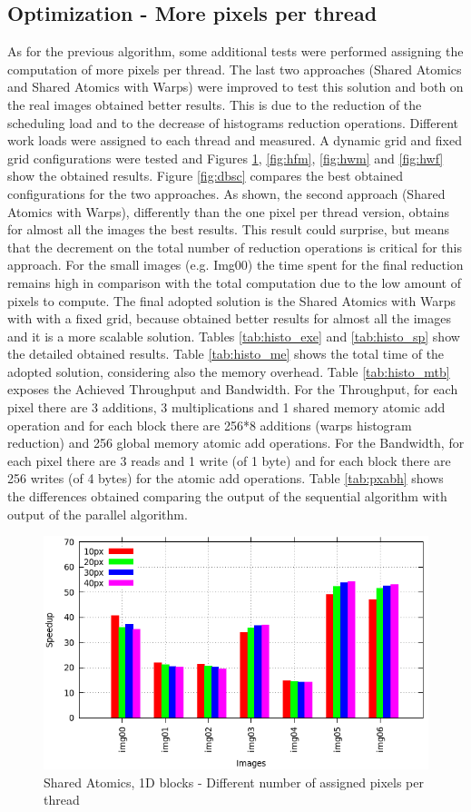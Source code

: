 \documentclass[a4paper]{article}
\begin{document}
\subsection{Optimization - More pixels per thread}
\label{sec:hop}
As for the previous algorithm, some additional tests were performed assigning the computation of more pixels per thread. The last two approaches (Shared Atomics and Shared Atomics with Warps) were improved to test this solution and both on the real images obtained better results. This is due to the reduction of the scheduling load and to the decrease of histograms reduction operations. Different work loads were assigned to each thread and measured. A dynamic grid and fixed grid configurations were tested and Figures \ref{fig:hum}, \ref{fig:hfm}, \ref{fig:hwm} and \ref{fig:hwf} show the obtained results. Figure \ref{fig:dbsc} compares the best obtained configurations for the two approaches. As shown, the second approach (Shared Atomics with Warps), differently than the one pixel per thread version, obtains for almost all the images the best results. This result could surprise, but means that the decrement on the total number of reduction operations is critical for this approach. For the small images (e.g. Img00) the time spent for the final reduction remains high in comparison with the total computation due to the low amount of pixels to compute. The final adopted solution is the Shared Atomics with Warps with with a fixed grid, because obtained better results for almost all the images and it is a more scalable solution. Tables \ref{tab:histo_exe} and \ref{tab:histo_sp} show the detailed obtained results. Table \ref{tab:histo_me} shows the total time of the adopted solution, considering also the memory overhead. Table \ref{tab:histo_mtb} exposes the Achieved Throughput and Bandwidth. For the Throughput, for each pixel there are 3 additions, 3 multiplications and 1 shared memory atomic add operation and for each block there are 256*8 additions (warps histogram reduction) and 256 global memory atomic add operations. For the Bandwidth, for each pixel there are 3 reads and 1 write (of 1 byte) and for each block there are 256 writes (of 4 bytes) for the atomic add operations.
Table \ref{tab:pxabh} shows the differences obtained comparing the output of the sequential algorithm with output of the parallel algorithm.


\begin{figure}[!ht]
    \centering
    \includegraphics[width=0.65\linewidth]{res/new/histogram_uni_more}
    \caption{Shared Atomics, 1D blocks - Different number of assigned pixels per thread}
    \label{fig:hum}
\end{figure}
\FloatBarrier
\end{document}

